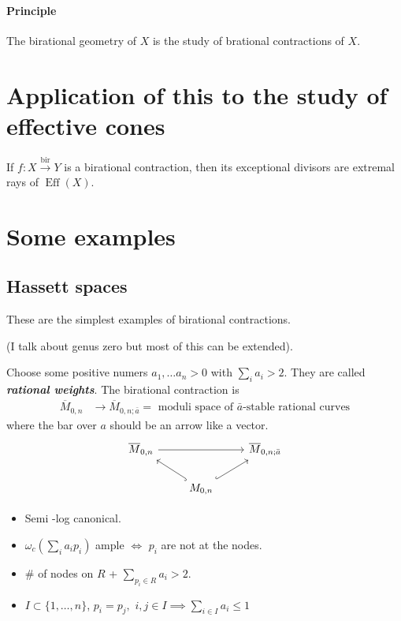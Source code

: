 \paragraph{Principle} The birational geometry of $X$ is the study of brational contractions of $X$.

\section{Application of this to the study of effective cones}

If $f:X\overset{\operatorname{bir}}{\longrightarrow}Y$ is a birational contraction, then its exceptional divisors are extremal rays of $\operatorname{E f f}(X)$.

\section{Some examples}
\subsection{Hassett spaces}
These are the simplest examples of birational contractions.

(I talk about genus zero but most of this can be extended).

Choose some positive numers $a_1,\ldots a_n>0$ with  $\sum_{i}a_i>2$. They are called \textit{\textbf{rational weights}}. The birational contraction is
\begin{align*}
	\overline{M}_{0,n}  &\longrightarrow \overline{M}_{0,n;\bar{a}}=\text{ moduli space of $\bar{a}$-stable rational curves} 
\end{align*}
where the bar over $a$ should be an arrow like a vector.
\[\begin{tikzcd}
\overline{M}_{0,n}\arrow[rr]&&\overline{M}_{0,n;\bar{a}}\\
&M_{0,n}\arrow[ul,hook]\arrow[ur,hook,swap]
\end{tikzcd}\]
\begin{itemize}
	\item Semi -log canonical.
 \item  $\omega_c\left( \sum_{i}a_i p_i \right) $ ample $ \iff$ $p_i$ are not at the nodes.
\item $\#$ of nodes on  $R$ + $\sum_{p_i\in R}a_i>2$.
\item $I\subset \{1,\ldots,n\}$, $p_i=p_j,$ $i,j\in I\implies \sum_{i \in I}a_i\leq 1$
\end{itemize}

